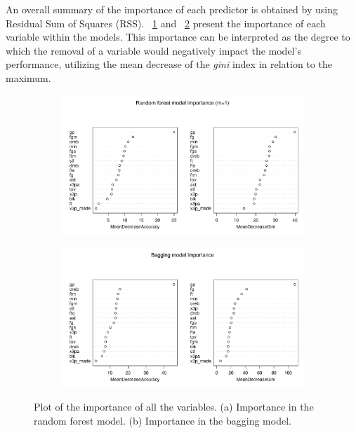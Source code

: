 An overall summary of the importance of each predictor is obtained by using Residual Sum of Squares (RSS). \Fig~\ref{fig:best_for_500_var_imp_plot} and \Fig~\ref{fig:bagg_500_var_imp_plot} present the importance of each variable within the models. This importance can be interpreted as the degree to which the removal of a variable would negatively impact the model's performance, utilizing the mean decrease of the \textit{gini} index in relation to the maximum.

\begin{figure}[h]
	\centering
	\begin{subfigure}{.5\textwidth}
		\centering
		\includegraphics[width=0.9\linewidth]{ImageFiles/Classification/Trees/best_for_500_var_imp_plot.pdf}
		\caption{}
		\label{fig:best_for_500_var_imp_plot}
	\end{subfigure}%
	\hfill
	\begin{subfigure}{.5\textwidth}
		\centering
		\includegraphics[width=0.9\linewidth]{ImageFiles/Classification/Trees/bagg_500_var_imp_plot.pdf}
		\caption{}
		\label{fig:bagg_500_var_imp_plot}
	\end{subfigure}
	\caption{Plot of the importance of all the variables. (a) Importance in the random forest model. (b) Importance in the bagging model.}
	\label{fig:ImpVar}
\end{figure}

